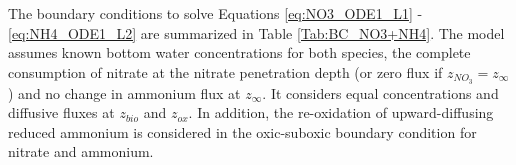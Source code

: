 \documentclass[gmd, manuscript]{copernicus}
\begin{document}
The boundary conditions to solve Equations \ref{eq:NO3_ODE1_L1} - \ref{eq:NH4_ODE1_L2} are summarized in Table \ref{Tab:BC_NO3+NH4}. The model assumes known bottom water concentrations 
for both species, the complete consumption of nitrate at the nitrate penetration depth (or zero flux if $z_{NO_3}=z_\infty$) and no change in ammonium flux at $z_\infty$. It considers equal concentrations and diffusive fluxes 
at $z_{bio}$ and $z_{ox}$.  In addition, the re-oxidation of upward-diffusing reduced ammonium is considered in the oxic-suboxic boundary condition for nitrate and ammonium. 
\end{document}
